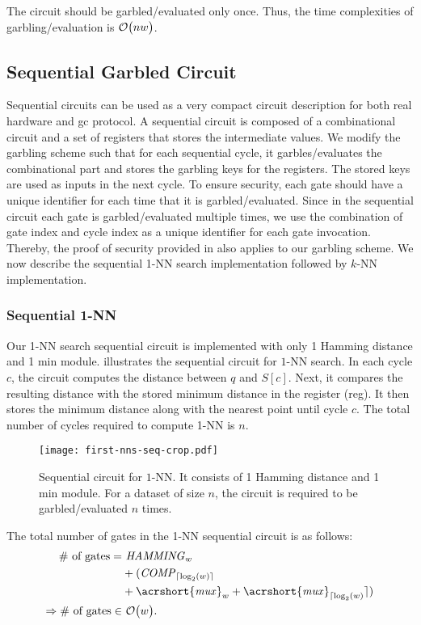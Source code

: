 The circuit should be garbled/evaluated only once.
Thus, the time complexities of garbling/evaluation is $\mathcal{O}\bigl(nw\bigr)$.

\subsection{Sequential Garbled Circuit}\label{ssec:knn-seqgc}
Sequential circuits can be used as a very compact circuit description for both real hardware and \acrshort{gc} protocol.
A sequential circuit is composed of a combinational circuit and a set of registers that stores the intermediate values.
We modify the garbling scheme such that for each sequential cycle, it garbles/evaluates the combinational part and stores the garbling keys for the registers.
The stored keys are used as inputs in the next cycle.
To ensure security, each gate should have a unique identifier for each time that it is garbled/evaluated.
Since in the sequential circuit each gate is garbled/evaluated multiple times, we use the combination of gate index and cycle index as a unique identifier for each gate invocation.
Thereby, the proof of security provided in \cite{lindell2009proof,bellare2013efficient} also applies to our garbling scheme.
We now describe the sequential 1-NN search implementation followed by $k$-NN implementation.

\subsubsection{Sequential 1-NN}
Our 1-NN search sequential circuit is implemented with only 1 Hamming distance and 1 min module.
 illustrates the sequential circuit for $1$-NN search.
In each cycle $c$, the circuit computes the distance between $q$ and $S[c]$.
Next, it compares the resulting distance with the stored minimum distance in the register (reg).
It then stores the minimum distance along with the nearest point until cycle $c$.
The total number of cycles required to compute 1-NN is $n$.

\begin{figure}
\centering
\texttt{[image: first-nns-seq-crop.pdf]}
\caption{Sequential circuit for $1$-NN.
It consists of 1 Hamming distance and 1 min module.
For a dataset of size $n$, the circuit is required to be garbled/evaluated $n$ times.}
\label{fig:fist-nns-seq}
\end{figure}

The total number of gates in the 1-NN sequential circuit is as follows:
\begin{align*}
\text{\# of gates}=	& ~ \mathit{HAMMING}_{w}\\
					& + (\mathit{COMP}_{\lceil \log _2(w) \rceil} \\
					& + \mathit{\acrshort{mux}}_w + \mathit{\acrshort{mux}}_{\lceil \log _2(w)} \rceil)\\
\Rightarrow \text{\# of gates} \in & ~ \BigO{w}.
\end{align*}

